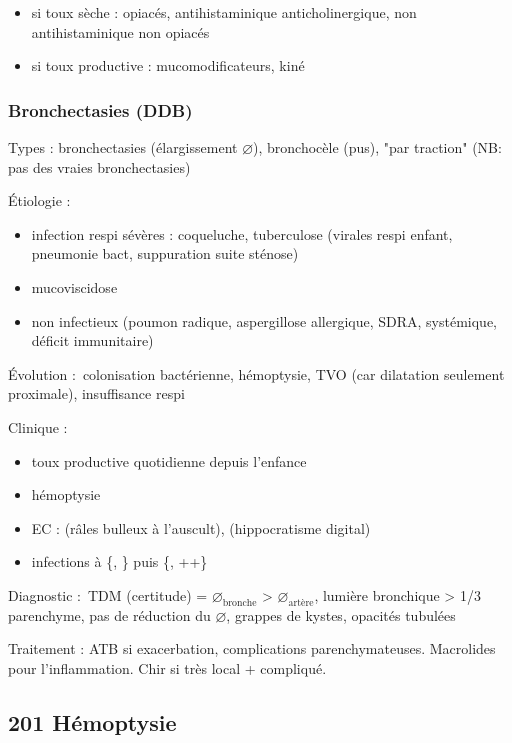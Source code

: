 \documentclass[11pt]{article}
\begin{document}
\begin{itemize}
\item si toux sèche : opiacés, antihistaminique anticholinergique, non
antihistaminique non opiacés
\item si toux productive : mucomodificateurs, kiné
\end{itemize}


\subsubsection{Bronchectasies (DDB)}
\label{sec:org14cd5bf}
\label{sub:bronchectasies}
Types : bronchectasies (élargissement \(\diameter\)), bronchocèle (pus), "par
traction" (NB: pas des vraies bronchectasies)

Étiologie :

\begin{itemize}
\item infection respi sévères : coqueluche, tuberculose (virales respi enfant,
pneumonie bact, suppuration suite sténose)
\item mucoviscidose
\item non infectieux (poumon radique, aspergillose allergique, SDRA,
systémique, déficit immunitaire)
\end{itemize}

Évolution : colonisation bactérienne, hémoptysie, TVO (car dilatation seulement
proximale), insuffisance respi

Clinique :

\begin{itemize}
\item toux productive quotidienne depuis l'enfance
\item hémoptysie
\item EC : (râles bulleux à l'auscult), (hippocratisme digital)
\item infections à \{, \} puis \{,
++\}
\end{itemize}


Diagnostic : TDM (certitude) = \(\diameter_\text{bronche}\) > \(\diameter_\text{artère}\), lumière
bronchique > 1/3 parenchyme, pas de réduction du \(\diameter\), grappes de kystes,
opacités tubulées

Traitement : ATB si exacerbation, complications parenchymateuses. Macrolides
pour l'inflammation. Chir si très local + compliqué.

\subsection{201 \textdagger{} Hémoptysie}
\label{sec:orgac7dc31}
\label{sec:201_hemoptysie}
\end{document}
